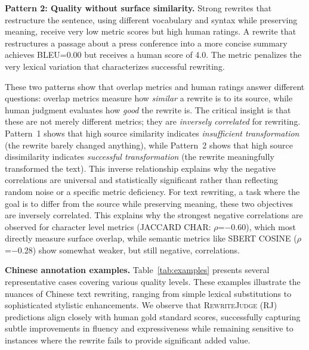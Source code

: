 \documentclass[11pt]{article}
\begin{document}
\textbf{Pattern 2: Quality without surface similarity.}
Strong rewrites that restructure the sentence, using different vocabulary and syntax while preserving meaning, receive very low metric scores but high human ratings.
A rewrite that restructures a passage about a press conference into a more concise summary achieves BLEU=0.00 but receives a human score of 4.0.
The metric penalizes the very lexical variation that characterizes successful rewriting.

These two patterns show that overlap metrics and human ratings answer different questions: overlap metrics measure how \emph{similar} a rewrite is to its source, while human judgment evaluates how \emph{good} the rewrite is.
The critical insight is that these are not merely different metrics; they are \emph{inversely correlated} for rewriting.
Pattern~1 shows that high source similarity indicates \emph{insufficient transformation} (the rewrite barely changed anything), while Pattern~2 shows that high source dissimilarity indicates \emph{successful transformation} (the rewrite meaningfully transformed the text).
This inverse relationship explains why the negative correlations are universal and statistically significant rather than reflecting random noise or a specific metric deficiency.
For text rewriting, a task where the goal is to differ from the source while preserving meaning, these two objectives are inversely correlated.
This explains why the strongest negative correlations are observed for character level metrics (JACCARD CHAR: $\rho$=$-$0.60), which most directly measure surface overlap, while semantic metrics like SBERT COSINE ($\rho$=$-$0.28) show somewhat weaker, but still negative, correlations.

\textbf{Chinese annotation examples.}
Table~\ref{tab:examples} presents several representative cases covering various quality levels. These examples illustrate the nuances of Chinese text rewriting, ranging from simple lexical substitutions to sophisticated stylistic enhancements. We observe that \textsc{RewriteJudge} (RJ) predictions align closely with human gold standard scores, successfully capturing subtle improvements in fluency and expressiveness while remaining sensitive to instances where the rewrite fails to provide significant added value.
\end{document}
